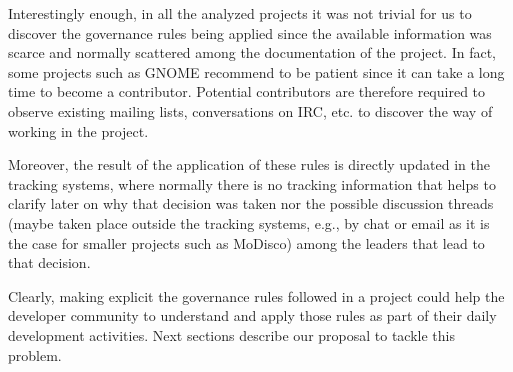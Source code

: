 Interestingly enough, in all the analyzed projects it was not trivial for us to discover the governance rules being applied since the available information was scarce and normally scattered among the documentation of the project. In fact, some projects such as GNOME recommend to be patient since it can take a long time to become a contributor. Potential contributors are therefore required to observe existing mailing lists, conversations on IRC, etc. to discover the way of working in the project. 

Moreover, the result of the application of these rules is directly updated in the tracking systems, where normally there is no tracking information that helps to clarify later on why that decision was taken nor the possible discussion threads (maybe taken place outside the tracking systems, e.g., by chat or email as it is the case for smaller projects such as MoDisco) among the leaders that lead to that decision. 

Clearly, making explicit the governance rules followed in a project could help the developer community to understand and apply those rules as part of their daily development activities. Next sections describe our proposal to tackle this problem.

